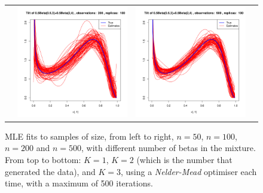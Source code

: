 \begin{figure}[h]
\begin{tabular}{cccc}
	&
	\includegraphics[width=\textwidth/4]{../img/p05_a05_b3_p05_a2_b4/tilted/K3/densities/n200_R100.pdf}
	&
	\includegraphics[width=\textwidth/4]{../img/p05_a05_b3_p05_a2_b4/tilted/K3/densities/n500_R100.pdf}\\
	
\end{tabular}
\caption{MLE fits to samples of size, from left to right, $n=50$, $n=100$, $n=200$ and $n=500$, with different number of betas in the mixture. From top to bottom: $K=1$, $K=2$ (which is the number that generated the data), and $K=3$, using a \textit{Nelder-Mead} optimiser each time, with a maximum of 500 iterations.}
\label{fig:TDB1}
\end{figure}

